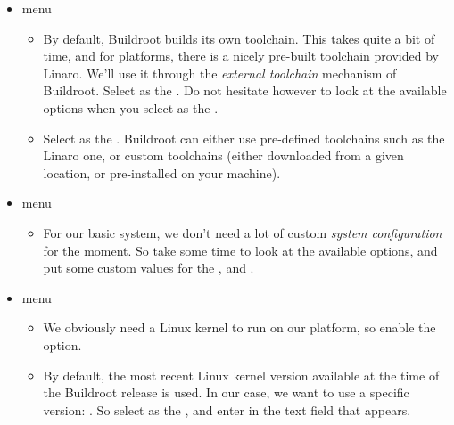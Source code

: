 \begin{itemize}
\item {} menu

  \begin{itemize}

  \item By default, Buildroot builds its own toolchain. This takes
    quite a bit of time, and for  platforms, there is a
    nicely pre-built toolchain provided by Linaro. We'll use it
    through the {\em external toolchain} mechanism of
    Buildroot. Select  as the
    . Do not hesitate however to look at the
    available options when you select  as
    the .

  \item Select  as the
    . Buildroot can either use pre-defined toolchains
    such as the Linaro one, or custom toolchains (either downloaded
    from a given location, or pre-installed on your machine).

  \end{itemize}

\item {} menu

  \begin{itemize}

  \item For our basic system, we don't need a lot of custom {\em
      system configuration} for the moment. So take some time to look
    at the available options, and put some custom values for the
    ,  and .

  \end{itemize}

\item {} menu

  \begin{itemize}

  \item We obviously need a Linux kernel to run on our platform, so
    enable the  option.

  \item By default, the most recent Linux kernel version available at
    the time of the Buildroot release is used. In our case, we want to
    use a specific version: . So select  as the , and enter  in
    the  text field that appears.


\end{itemize}
\end{itemize}
